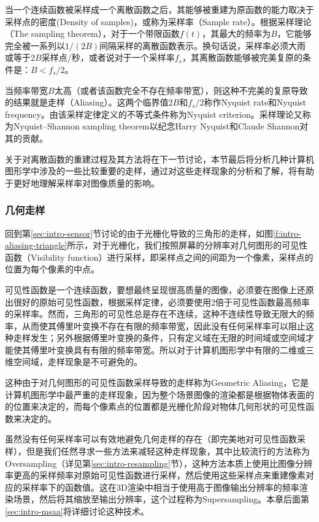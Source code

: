 当一个连续函数被采样成一个离散函数之后，其能够被重建为原函数的能力取决于采样点的密度(Density of samples)，或称为采样率（Sample rate）。根据采样理论（The sampling theorem），对于一个带限函数$f(t)$，其最大的频率为$B$，它能够完全被一系列以$1/(2B)$间隔采样的离散函数表示。换句话说，采样率必须大雨或等于$2B$采样点/秒，或者说对于一个采样率$f_s$，其离散函数能够被完美复原的条件是：$B<f_s/2$。

当频率带宽$B$太高（或者该函数完全不存在频率带宽），则这种不完美的复原导致的结果就是走样（Aliasing）。这两个临界值$2B$和$f_s/2$称作Nyquist rate和Nyquist frequency。由该采样定律定义的不等式条件称为Nyquist criterion。采样理论又称为Nyquist–Shannon sampling theorem以纪念Harry Nyquist和Claude Shannon对其的贡献。 

关于对离散函数的重建过程及其方法将在下一节讨论，本节最后将分析几种计算机图形学中涉及的一些比较重要的走样，通过对这些走样现象的分析和了解，将有助于更好地理解采样率对图像质量的影响。




\subsubsection{几何走样}
回到第\ref{sec:intro-sensor}节讨论的由于光栅化导致的三角形的走样，如图\ref{f:intro-aliasing-triangle}所示，对于光栅化，我们按照屏幕的分辨率对几何图形的可见性函数（Visibility function）进行采样，即采样点之间的间距为一个像素，采样点的位置为每个像素的中点。

可见性函数是一个连续函数，要想最终呈现很高质量的图像，必须要在图像上还原出很好的原始可见性函数，根据采样定律，必须要使用2倍于可见性函数最高频率的采样率。然而，三角形的可见性总是存在不连续，这种不连续性导致无限大的频率，从而使其傅里叶变换不存在有限的频率带宽，因此没有任何采样率可以阻止这种走样发生；另外根据傅里叶变换的条件，只有定义域在无限的时间域或空间域才能使其傅里叶变换具有有限的频率带宽。所以对于计算机图形学中有限的二维或三维空间域，走样现象是不可避免的。

这种由于对几何图形的可见性函数采样导致的走样称为Geometric Aliasing，它是计算机图形学中最严重的走样现象，因为整个场景图像的渲染都是根据物体表面的的位置来决定的，而每个像素点的位置都是光栅化阶段对物体几何形状的可见性函数来决定的。

虽然没有任何采样率可以有效地避免几何走样的存在（即完美地对可见性函数采样），但是我们任然寻求一些方法来减轻这种走样现象，其中比较流行的方法称为Oversampling（详见第\ref{sec:intro-resampling}节），这种方法本质上使用比图像分辨率更高的采样频率对原始可见性函数进行采样，然后使用这些采样点来重建像素对应的采样率下的函数值。这在3D渲染中相当于使用高于图像输出分辨率的频率渲染场景，然后将其缩放至输出分辨率，这个过程称为Supersampling。本章后面第\ref{sec:intro-msaa}将详细讨论这种技术。




